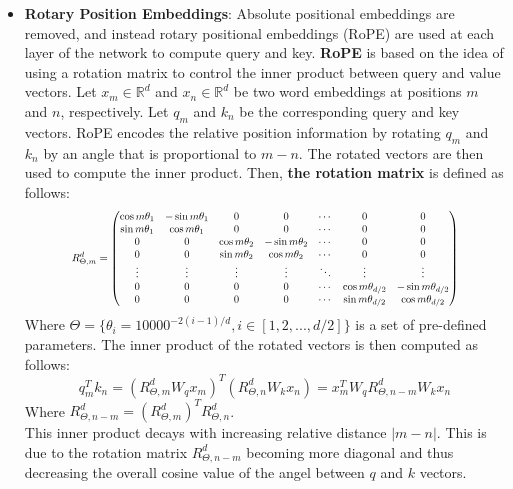 \documentclass{article}
\newcommand\scalemath[2]{\scalebox{#1}{\mbox{\ensuremath{\displaystyle #2}}}}
\begin{document}
\begin{itemize}
			\item 
				\textbf{Rotary Position Embeddings}: Absolute positional embeddings are removed, and instead rotary positional embeddings (RoPE)  \cite{su2023roformerenhancedtransformerrotary} are used at each layer of the network to compute query and key. \textbf{RoPE} is based on the idea of using a rotation matrix to control the inner product between query and value vectors.
				Let $x_m \in \mathbb{R}^d$ and $x_n \in \mathbb{R}^d$ be two word embeddings at positions $m$ and $n$, respectively. Let $q_m$ and $k_n$ be the corresponding query and key vectors. RoPE encodes the relative position information by rotating $q_m$ and $k_n$ by an angle that is proportional to $m-n$. The rotated vectors are then used to compute the inner product. Then, \textbf{the rotation matrix} is defined as follows: 
				\begin{equation}
					\scalemath{0.75}{
						R^d_{\Theta,m} = 
						\begin{pmatrix}
							\cos{m\theta_1}& -\sin{m\theta_1}&0&0&\cdots&0&0\\
							\sin{m\theta_1}&\cos{m\theta_1}&0&0&\cdots&0&0 \\
							0&0&\cos{m\theta_2}& -\sin{m\theta_2}&\cdots&0&0\\
							0&0&\sin{m\theta_2}&\cos{m\theta_2}&\cdots&0&0 \\
							\vdots&\vdots&\vdots&\vdots&\ddots&\vdots&\vdots\\
							0&0&0&0&\cdots&\cos{m\theta_{d/2}}& -\sin{m\theta_{d/2}}\\
							0&0&0&0&\cdots&\sin{m\theta_{d/2}}&\cos{m\theta_{d/2}}
						\end{pmatrix}
					}
					\label{fn:rope-RMat}
				\end{equation}
				Where $\Theta = \{\theta_i = 10000^{-2(i-1)/d}, i \in [1, 2, ..., d/2]\}$ is a set of pre-defined parameters.
				The inner product of the rotated vectors is then computed as follows:
				\begin{equation}
					q_m^T k_n = (R_{\Theta,m}^{d} W_q x_m)^T (R_{\Theta,n}^{d} W_k x_n) = x_m^T W_q R_{\Theta,n-m}^{d} W_k x_n
					\label{q_k_inner_product}
				\end{equation}
				Where $R_{\Theta,n-m}^{d} = (R_{\Theta,m}^{d})^T R_{\Theta,n}^{d}$. \\
				This inner product decays with increasing relative distance $|m - n|$. This is due to the rotation matrix $R_{\Theta,n-m}^{d}$ becoming more diagonal and thus decreasing the overall cosine value of the angel between $q$ and $k$ vectors.
				
				
		\end{itemize}
		
\end{document}

